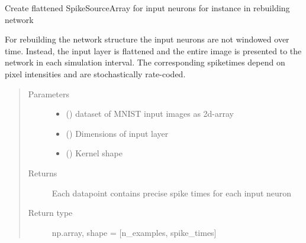 \documentclass[letterpaper,10pt,english]{sphinxmanual}
\begin{document}
\begin{fulllineitems}
\label{\detokenize{SpikingConvNet:SpikingConvNet.algorithms.input_flattend_spikes}}
Create flattened SpikeSourceArray for input neurons
for instance in rebuilding network

For rebuilding the network structure the input neurons are not windowed
over time. Instead, the input layer is flattened and the entire image is
presented to the network in each simulation interval.
The corresponding spiketimes depend on pixel intensities and are
stochastically rate-coded.
\begin{quote}\begin{description}
\item[{Parameters}] \leavevmode\begin{itemize}
\item {} 
 () \textendash{} dataset of MNIST input images as 2d-array

\item {} 
 () \textendash{} Dimensions of input layer

\item {} 
 () \textendash{} Kernel shape

\end{itemize}

\item[{Returns}] \leavevmode
{} \textendash{} Each datapoint contains precise spike times for each input neuron

\item[{Return type}] \leavevmode
np.array, shape = {[}n\_examples, spike\_times{]}

\end{description}\end{quote}

\end{fulllineitems}

\end{document}
